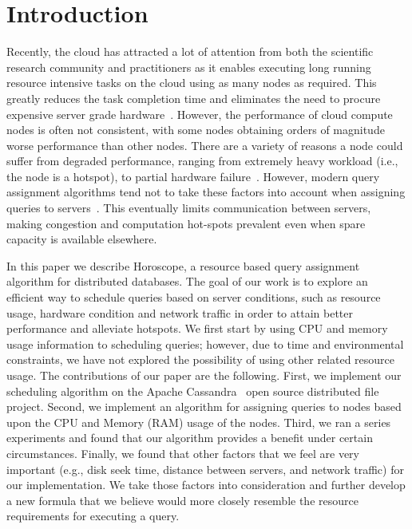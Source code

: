 \section{Introduction}

Recently, the cloud has attracted a lot of attention from both the scientific research community and practitioners as it enables executing long running resource intensive tasks on the cloud using as many nodes as required. This greatly reduces the task completion time and eliminates the need to procure expensive server grade hardware~\cite{Agrawal:2008:CRD:1462571.1462573}. However, the performance of cloud compute nodes is often not consistent, with some nodes obtaining orders of magnitude worse performance than other nodes. There are a variety of reasons a node could suffer from degraded performance, ranging from extremely heavy workload (i.e., the node is a hotspot), to partial hardware failure~\cite{citeulike:6656195}. However, modern query assignment algorithms tend not to take these factors into account when assigning queries to servers~\cite{borthakur-07}. This eventually limits communication between servers, making congestion and computation hot-spots prevalent even when spare capacity is available elsewhere.

In this paper we describe Horoscope, a resource based query assignment algorithm for distributed databases. The goal of our work is to explore an efficient way to schedule queries based on server conditions, such as resource usage, hardware condition and network traffic in order to attain better performance and alleviate hotspots. We first start by using CPU and memory usage information to scheduling queries; however, due to time and environmental constraints, we have not explored the possibility of using other related resource usage. The contributions of our paper are the following. First, we implement our scheduling algorithm on the Apache Cassandra~\cite{ Lakshman:2010:CDS:1773912.1773922} open source distributed file project. Second, we implement an algorithm for assigning queries to nodes based upon the CPU and Memory (RAM) usage of the nodes. Third, we ran a series experiments and found that our algorithm provides a benefit under certain circumstances. Finally, we found that other factors that we feel are very important (e.g., disk seek time, distance between servers, and network traffic) for our implementation. We take those factors into consideration and further develop a new formula that we believe would more closely resemble the resource requirements for executing a query.
 
